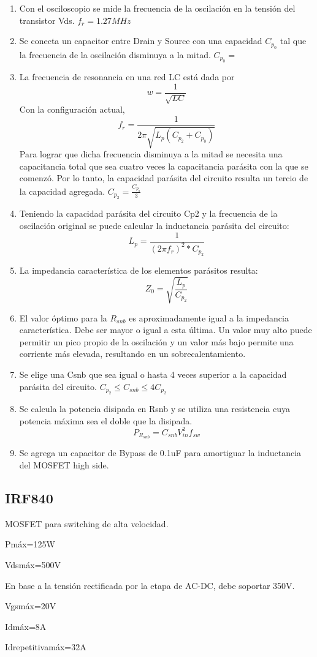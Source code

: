 \begin{enumerate}
    \item Con el osciloscopio se mide la frecuencia de la oscilación en la tensión del transistor Vds. $f_{r}=1.27MHz$ %
    \item Se conecta un capacitor entre Drain y Source con una capacidad $C_{p_{0}}$ tal que la frecuencia de la oscilación disminuya a la mitad. $C_{p_{0}}=$
    \item La frecuencia de resonancia en una red LC está dada por
    $$ w=\frac{1}{\sqrt{LC}} $$
    Con la configuración actual, 
    $$ f_{r}=\frac{1}{2\pi\sqrt{L_{p}(C_{p_{2}}+C_{p_{0}})}} $$
    Para lograr que dicha frecuencia disminuya a la mitad se necesita una capacitancia total que sea cuatro veces la capacitancia parásita con la que se comenzó.
    Por lo tanto, la capacidad parásita del circuito resulta un tercio de la capacidad agregada. $C_{p_{2}} = \frac{C_{p_{0}}}{3}$
    \item Teniendo la capacidad parásita del circuito Cp2 y la frecuencia de la oscilación original se puede calcular la inductancia parásita del circuito:
    $$ L_{p}=\frac{1}{(2\pi f_{r})^{2}*C_{p_{2}}} $$
    \item La impedancia característica de los elementos parásitos resulta:
    $$ Z_{0}=\sqrt{\frac{L_p}{C_{p_2}}} $$
    \item El valor óptimo para la $R_{snb}$ es aproximadamente igual a la impedancia característica. Debe ser mayor o igual a esta última. Un valor muy alto puede permitir un pico propio de la oscilación y un valor más bajo permite una corriente más elevada, resultando en un sobrecalentamiento.
    \item Se elige una Csnb que sea igual o hasta 4 veces superior a la capacidad parásita del circuito. $C_{p_2}\leq C_{snb}\leq 4C_{p_2}$
    \item Se calcula la potencia disipada en Rsnb y se utiliza una resistencia cuya potencia máxima sea el doble que la disipada.
    $$ P_{R_{snb}}=C_{snb}V_{in}^2f_{sw} $$
    \item Se agrega un capacitor de Bypass de 0.1uF para amortiguar la inductancia del MOSFET high side.     
\end{enumerate}

\subsection{IRF840}

MOSFET para switching de alta velocidad. 

Pmáx=125W

Vdsmáx=500V

En base a la tensión rectificada por la etapa de AC-DC, debe soportar 350V. 

Vgsmáx=20V
 
Idmáx=8A

Idrepetitivamáx=32A


